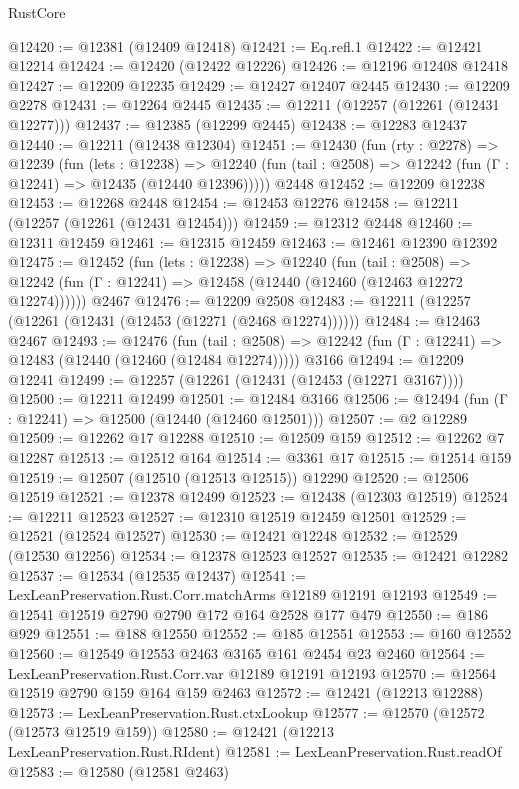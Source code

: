 \begin{lexlean}{RustCore}
\begin{coremodule}
@12420 := @12381 (@12409 @12418)
@12421 := Eq.refl.{1}
@12422 := @12421 @12214
@12424 := @12420 (@12422 @12226)
@12426 := @12196 @12408 @12418
@12427 := @12209 @12235
@12429 := @12427 @12407 @2445
@12430 := @12209 @2278
@12431 := @12264 @2445
@12435 := @12211 (@12257 (@12261 (@12431 @12277)))
@12437 := @12385 (@12299 @2445)
@12438 := @12283 @12437
@12440 := @12211 (@12438 @12304)
@12451 := @12430
    (fun (rty : @2278) =>
    @12239
      (fun (lets : @12238) =>
      @12240 (fun (tail : @2508) => @12242 (fun (Γ : @12241) => @12435 (@12440 @12396)))))
    @2448
@12452 := @12209 @12238
@12453 := @12268 @2448
@12454 := @12453 @12276
@12458 := @12211 (@12257 (@12261 (@12431 @12454)))
@12459 := @12312 @2448
@12460 := @12311 @12459
@12461 := @12315 @12459
@12463 := @12461 @12390 @12392
@12475 := @12452
    (fun (lets : @12238) =>
    @12240
      (fun (tail : @2508) =>
      @12242 (fun (Γ : @12241) => @12458 (@12440 (@12460 (@12463 @12272 @12274))))))
    @2467
@12476 := @12209 @2508
@12483 := @12211 (@12257 (@12261 (@12431 (@12453 (@12271 (@2468 @12274))))))
@12484 := @12463 @2467
@12493 := @12476
    (fun (tail : @2508) => @12242 (fun (Γ : @12241) => @12483 (@12440 (@12460 (@12484 @12274)))))
    @3166
@12494 := @12209 @12241
@12499 := @12257 (@12261 (@12431 (@12453 (@12271 @3167))))
@12500 := @12211 @12499
@12501 := @12484 @3166
@12506 := @12494 (fun (Γ : @12241) => @12500 (@12440 (@12460 @12501)))
@12507 := @2 @12289
@12509 := @12262 @17 @12288
@12510 := @12509 @159
@12512 := @12262 @7 @12287
@12513 := @12512 @164
@12514 := @3361 @17
@12515 := @12514 @159
@12519 := @12507 (@12510 (@12513 @12515)) @12290
@12520 := @12506 @12519
@12521 := @12378 @12499
@12523 := @12438 (@12303 @12519)
@12524 := @12211 @12523
@12527 := @12310 @12519 @12459 @12501
@12529 := @12521 (@12524 @12527)
@12530 := @12421 @12248
@12532 := @12529 (@12530 @12256)
@12534 := @12378 @12523 @12527
@12535 := @12421 @12282
@12537 := @12534 (@12535 @12437)
@12541 := LexLeanPreservation.Rust.Corr.matchArms @12189 @12191 @12193
@12549 := @12541 @12519 @2790 @2790 @172 @164 @2528 @177 @479
@12550 := @186 @929
@12551 := @188 @12550
@12552 := @185 @12551
@12553 := @160 @12552
@12560 := @12549 @12553 @2463 @3165 @161 @2454 @23 @2460
@12564 := LexLeanPreservation.Rust.Corr.var @12189 @12191 @12193
@12570 := @12564 @12519 @2790 @159 @164 @159 @2463
@12572 := @12421 (@12213 @12288)
@12573 := LexLeanPreservation.Rust.ctxLookup
@12577 := @12570 (@12572 (@12573 @12519 @159))
@12580 := @12421 (@12213 LexLeanPreservation.Rust.RIdent)
@12581 := LexLeanPreservation.Rust.readOf
@12583 := @12580 (@12581 @2463)

\end{coremodule}
\end{lexlean}
